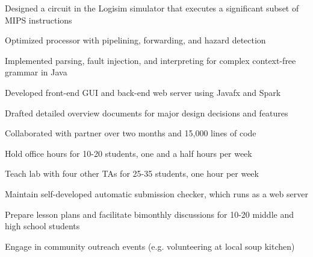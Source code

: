 \documentclass{resume}
\begin{document}
\begin{projects}
    \begin{description}
        \item Designed a circuit in the Logisim simulator that executes a significant subset of MIPS instructions
        \item Optimized processor with pipelining, forwarding, and hazard detection
    \end{description}

    \begin{description}
        \item Implemented parsing, fault injection, and interpreting for complex context-free grammar in Java
        \item Developed front-end GUI and back-end web server using Javafx and Spark
        \item Drafted detailed overview documents for major design decisions and features
        \item Collaborated with partner over two months and 15,000 lines of code
    \end{description}
\end{projects}

\begin{leadership experience}
    \begin{description}
        \item Hold office hours for 10-20 students, one and a half hours per week
        \item Teach lab with four other TAs for 25-35 students, one hour per week
        \item Maintain self-developed automatic submission checker, which runs as a web server
    \end{description}

    \begin{description}
        \item Prepare lesson plans and facilitate bimonthly discussions for 10-20 middle and high school students
        \item Engage in community outreach events (e.g. volunteering at local soup kitchen)
    \end{description}
\end{leadership experience}
\end{document}
